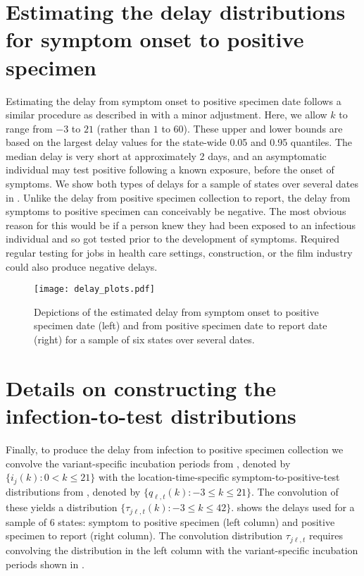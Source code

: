 \section{Estimating the delay distributions for symptom onset to positive specimen}
\label{sec:delay-sops}


Estimating the delay from symptom onset to positive specimen date follows a
similar procedure as described in  with a minor
adjustment. Here, we allow $k$ to range from $-3$ to $21$ (rather than $1$ to
$60$). These upper and lower bounds are based on the largest delay values for
the state-wide 0.05 and 0.95 quantiles. The median
delay is very short at approximately 2 days, and an asymptomatic individual may
test positive following a known exposure, before the onset of symptoms. We show
both types of delays for a sample of states over several dates in
. Unlike the delay from positive specimen collection
to report, the delay from symptoms to positive specimen can conceivably be
negative. The most obvious reason for this would be if a person knew they had been
exposed to an infectious individual and so got tested prior to the development
of symptoms. Required regular testing for jobs in health care settings,
construction, or the film industry could also produce negative delays.


\begin{figure}[t!]
\centering
    \texttt{[image: delay\_plots.pdf]} 
    \caption{Depictions of the estimated delay from symptom onset to
    positive specimen date (left) and from positive specimen date to report date
    (right) for a sample of six states over several dates.}
    \label{fig:delay-plots-samp}
\end{figure}

\section{Details on constructing the infection-to-test distributions}
\label{sec:details-conv}

Finally, to produce the delay from infection to positive specimen collection we
convolve the variant-specific incubation periods from ,
denoted by $\{i_{j}(k) : 0 < k \leq 21\}$ with the location-time-specific
symptom-to-positive-test distributions from , denoted by
$\{q_{\ell,t}(k) : -3\leq k \leq 21\}$. The convolution of these yields a
distribution $\{\tau_{j\ell,t}(k): -3 \leq k
\leq 42\}$.  shows the delays used for a sample of 6
states: symptom to positive specimen (left column) and positive specimen to report
(right column). The convolution distribution $\tau_{j\ell,t}$ requires
convolving the distribution in the left column with the variant-specific
incubation periods shown in .





